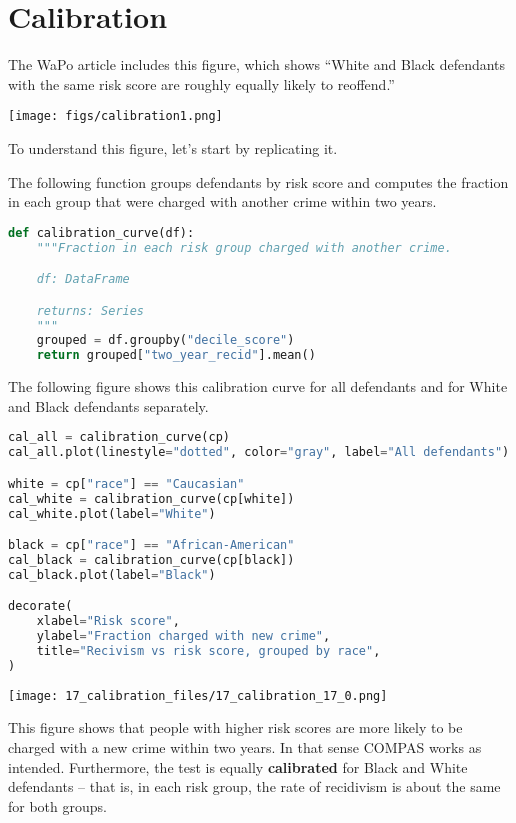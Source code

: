 \section{Calibration}\label{calibration}

The WaPo article includes this figure, which shows ``White and Black
defendants with the same risk score are roughly equally likely to
reoffend.''

\texttt{[image: figs/calibration1.png]}

To understand this figure, let's start by replicating it.

The following function groups defendants by risk score and computes the
fraction in each group that were charged with another crime within two
years.

\begin{lstlisting}[language=Python,style=source]
def calibration_curve(df):
    """Fraction in each risk group charged with another crime.

    df: DataFrame

    returns: Series
    """
    grouped = df.groupby("decile_score")
    return grouped["two_year_recid"].mean()
\end{lstlisting}

The following figure shows this calibration curve for all defendants and
for White and Black defendants separately.

\begin{lstlisting}[language=Python,style=source]
cal_all = calibration_curve(cp)
cal_all.plot(linestyle="dotted", color="gray", label="All defendants")

white = cp["race"] == "Caucasian"
cal_white = calibration_curve(cp[white])
cal_white.plot(label="White")

black = cp["race"] == "African-American"
cal_black = calibration_curve(cp[black])
cal_black.plot(label="Black")

decorate(
    xlabel="Risk score",
    ylabel="Fraction charged with new crime",
    title="Recivism vs risk score, grouped by race",
)
\end{lstlisting}

\begin{center}
\texttt{[image: 17\_calibration\_files/17\_calibration\_17\_0.png]}
\end{center}

This figure shows that people with higher risk scores are more likely to
be charged with a new crime within two years. In that sense COMPAS works
as intended. Furthermore, the test is equally \textbf{calibrated} for
Black and White defendants -- that is, in each risk group, the rate of
recidivism is about the same for both groups.

